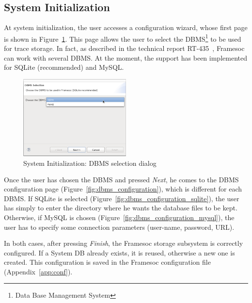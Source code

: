 \documentclass[twoside]{article}
\begin{document}
\begin{sloppypar}
\subsection{System Initialization}
\label{subsec:init}

At system initialization, the user accesses a configuration wizard, whose first page is shown in Figure~\ref{fig:dbms_selection}. 
This page allows the user to select the DBMS\footnote{Data Base Management System} to be used for trace storage.
In fact, as described in the technical report RT-435~\cite{pagano:hal-00830008}, Framesoc can work with several DBMS.
At the moment, the support has been implemented for SQLite (recommended) and MySQL.

\begin{figure}[h!]
  \centering
    \includegraphics[width=0.5\textwidth]{images/dbms_selection.png}
  \caption{System Initialization: DBMS selection dialog}
  \label{fig:dbms_selection}
\end{figure}

Once the user has chosen the DBMS and pressed \emph{Next}, he comes to the DBMS configuration page (Figure~\ref{fig:dbms_configuration}), which is different for each DBMS.
If SQLite is selected (Figure~\ref{fig:dbms_configuration_sqlite}), the user has simply to enter the directory where he wants the database files to be kept.
Otherwise, if MySQL is chosen (Figure~\ref{fig:dbms_configuration_mysql}), the user has to specify some connection parameters (user-name, password, URL).

In both cases, after pressing \emph{Finish}, the Framesoc storage subsystem is correctly configured. 
If a System DB already exists, it is reused, otherwise a new one is created.
This configuration is saved in the Framesoc configuration file (Appendix~\ref{app:conf}). %


\end{sloppypar}
\end{document}
